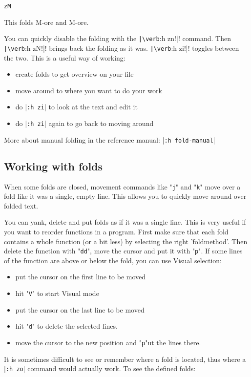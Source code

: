 \begin{Verbatim}[samepage=true]
 zM
\end{Verbatim}

This folds M-ore and M-ore.

You can quickly disable the folding with the \verb!|\verb!:h zn!|! command.
Then \verb!|\verb!:h zN!|! brings back the folding as it was.
\verb!|\verb!:h zi!|! toggles between the two.
This is a useful way of working:

\begin{itemize}
\item create folds to get overview on your file
\item move around to where you want to do your work
\item do |\verb!:h zi!| to look at the text and edit it
\item do |\verb!:h zi!| again to go back to moving around
\end{itemize}

More about manual folding in the reference manual: |\verb!:h fold-manual!|
\subsection{Working with folds}
When some folds are closed, movement commands like "\verb!j!" and "\verb!k!" move over a fold like it was a single, empty line.
This allows you to quickly move around over folded text.

You can yank, delete and put folds as if it was a single line.
This is very useful if you want to reorder functions in a program.
First make sure that each fold contains a whole function (or a bit less) by selecting the right 'foldmethod'.
Then delete the function with "\verb!dd!", move the cursor and put it with "\verb!p!".
If some lines of the function are above or below the fold, you can use Visual selection:

\begin{itemize}
\item put the cursor on the first line to be moved
\item hit "\verb!V!" to start Visual mode
\item put the cursor on the last line to be moved
\item hit "\verb!d!" to delete the selected lines.
\item move the cursor to the new position and "\verb!p!"ut the lines there.
\end{itemize}

It is sometimes difficult to see or remember where a fold is located, thus where a |\verb!:h zo!| command would actually work.
To see the defined folds:


